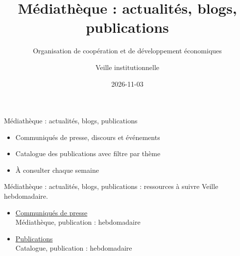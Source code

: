 \documentclass[aspectratio=169,11pt]{beamer}
\title{Médiathèque : actualités, blogs, publications}
\subtitle{Organisation de coopération et de développement économiques}
\author{Veille institutionnelle}
\date{2026-11-03}
\begin{document}
\begin{frame}\titlepage\end{frame}

\begin{frame}{Médiathèque : actualités, blogs, publications}
\begin{itemize}
\item Communiqués de presse, discours et événements
\item Catalogue des publications avec filtre par thème
\item À consulter chaque semaine
\end{itemize}
\end{frame}

\begin{frame}{Médiathèque : actualités, blogs, publications : ressources à suivre}
\small
Veille hebdomadaire.
\begin{itemize}
\item \href{https://www.oecd.org/en/about/news/press-releases.html}{Communiqués de presse}\\{\footnotesize Médiathèque, publication : hebdomadaire}
\item \href{https://www.oecd.org/en/publications.html}{Publications}\\{\footnotesize Catalogue, publication : hebdomadaire}
\end{itemize}
\end{frame}
\end{document}
